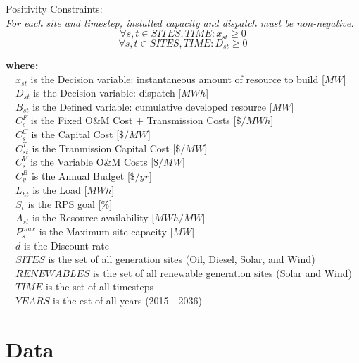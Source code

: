 \documentclass[12pt,letterpaper,fleqn]{article}
\begin{document}
  Positivity Constraints:\\
  \emph{For each site and timestep, installed capacity and dispatch
    must be non-negative.}
  \[\forall s,t \in SITES, TIME: x_{st} \ge 0\]
  \[\forall s,t \in SITES, TIME: D_{st} \ge 0\]
  
  \textbf{where:}\\
  {\setlength{\parindent}{-1em}
    $\quad x_{st}^{}$ is the Decision variable: instantaneous amount of resource to build [$MW$]\\
    $\quad D_{st}^{}$ is the Decision variable: dispatch [$MWh$]\\
    $\quad B_{st}^{}$ is the Defined variable: cumulative developed resource [$MW$]\\
    $\quad C_{s}^{F}$ is the Fixed O\&M Cost + Transmission Costs [$\$/MWh$]\\
    $\quad C_{s}^{C}$ is the Capital Cost [$\$/MW$]\\
    $\quad C_{st}^{T}$ is the Tranmission Capital Cost [$\$/MW$]\\
    $\quad C_{s}^{V}$ is the Variable O\&M Costs [$\$/MW$]\\
    $\quad C_{y}^{B}$ is the Annual Budget [$\$/yr$]\\
    $\quad L_{ht}^{}$ is the Load [$MWh$]\\
    $\quad S_{t}^{}$ is the RPS goal [$\%$]\\
    $\quad A_{st}^{}$ is the Resource availability [$MWh/MW$]\\
    $\quad P_{s}^{max}$ is the Maximum site capacity [$MW$]\\
    $\quad d$ is the Discount rate\\
    $\quad SITES$ is the set of all generation sites (Oil, Diesel,
    Solar, and Wind)\\
    $\quad RENEWABLES$ is the set of all renewable generation sites
    (Solar and Wind)\\
    $\quad TIME$ is the set of all timesteps\\
    $\quad YEARS$ is the est of all years (2015 - 2036)
  }


\section{Data}
\end{document}
